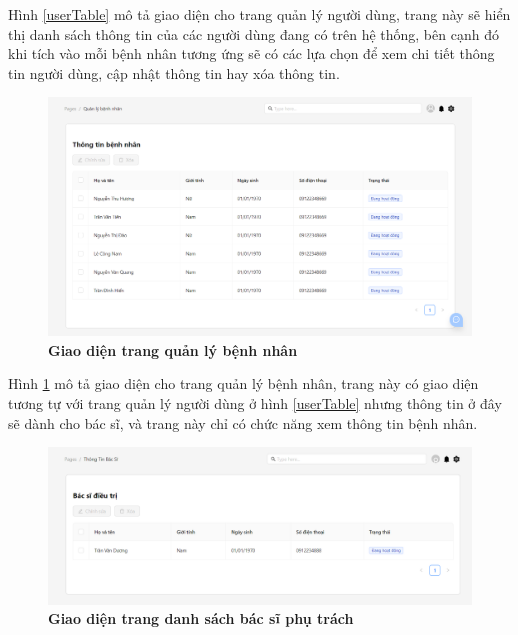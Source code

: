 Hình \ref{userTable} mô tả giao diện cho trang quản lý người dùng, trang này sẽ hiển thị danh sách
thông tin của các người dùng đang có trên hệ thống, bên cạnh đó khi tích vào mỗi bệnh
nhân tương ứng sẽ có các lựa chọn để xem chi tiết thông tin người dùng, cập nhật thông
tin hay xóa thông tin.

\begin{figure}[H]
  \centering
  \includegraphics[scale=0.5]{Images/server/webUI/patientTable.png}
  \caption[Giao diện trang quản lý bệnh nhân]{\bfseries \fontsize{12pt}{0pt}\selectfont Giao diện trang quản lý bệnh nhân}
  \label{patientTable} %
\end{figure}

Hình \ref{patientTable} mô tả giao diện cho trang quản lý bệnh nhân, trang này có giao diện tương tự với trang 
quản lý người dùng ở hình \ref{userTable} nhưng thông tin ở đây sẽ dành cho bác sĩ, và trang này chỉ có chức năng xem thông tin bệnh nhân.

\begin{figure}[H]
  \centering
  \includegraphics[scale=0.5]{Images/server/webUI/manageDoctor.png}
  \caption[Giao diện trang danh sách bác sĩ phụ trách]{\bfseries \fontsize{12pt}{0pt}\selectfont Giao diện trang danh sách bác sĩ phụ trách}
  \label{doctorTable} %
\end{figure}

